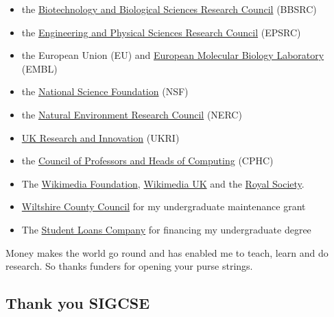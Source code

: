\documentclass[
]{book}
\providecommand{\tightlist}{%
  \setlength{\itemsep}{0pt}\setlength{\parskip}{0pt}}
\begin{document}
\begin{itemize}
\tightlist
\item
  the \href{https://en.wikipedia.org/wiki/Biotechnology_and_Biological_Sciences_Research_Council}{Biotechnology and Biological Sciences Research Council} (BBSRC)
\item
  the \href{https://en.wikipedia.org/wiki/Engineering_and_Physical_Sciences_Research_Council}{Engineering and Physical Sciences Research Council} (EPSRC)
\item
  the European Union (EU) and \href{https://en.wikipedia.org/wiki/European_Molecular_Biology_Laboratory}{European Molecular Biology Laboratory} (EMBL)
\item
  the \href{https://en.wikipedia.org/wiki/National_Science_Foundation}{National Science Foundation} (NSF)
\item
  the \href{https://en.wikipedia.org/wiki/Natural_Environment_Research_Council}{Natural Environment Research Council} (NERC)
\item
  \href{https://en.wikipedia.org/wiki/UK_Research_and_Innovation}{UK Research and Innovation} (UKRI)
\item
  the \href{https://cphc.ac.uk/}{Council of Professors and Heads of Computing} (CPHC)
\item
  The \href{https://en.wikipedia.org/wiki/Wikimedia_Foundation}{Wikimedia Foundation}, \href{https://wikimedia.org.uk/}{Wikimedia UK} and the \href{https://en.wikipedia.org/wiki/Royal_Society}{Royal Society}.
\item
  \href{https://en.wikipedia.org/wiki/Wiltshire_County_Council}{Wiltshire County Council} for my undergraduate maintenance grant
\item
  The \href{https://en.wikipedia.org/wiki/Student_Loans_Company}{Student Loans Company} for financing my undergraduate degree
\end{itemize}

Money makes the world go round and has enabled me to teach, learn and do research. So thanks funders for opening your purse strings. 🙏

\hypertarget{sigcse}{%
\subsection{Thank you SIGCSE}\label{sigcse}}
\end{document}
